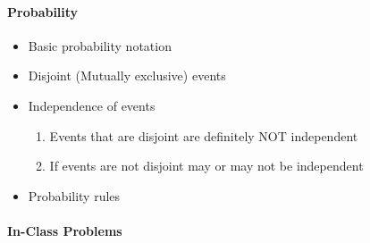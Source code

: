 \documentclass[10pt]{article}\usepackage[]{graphicx}\usepackage[]{color}
\newcommand{\cmd}[1]{\texttt{#1}}
\begin{document}
\paragraph{Probability}
\begin{itemize}
  \item Basic probability notation
  \item Disjoint (Mutually exclusive) events
  \item Independence of events
  \begin{enumerate}
    \item Events that are disjoint are definitely NOT independent
    \item If events are not disjoint may or may not be independent
  \end{enumerate}
  \item Probability rules
\end{itemize}



% 
% 
% 
% 
% 

\paragraph{In-Class Problems}
\end{document}
